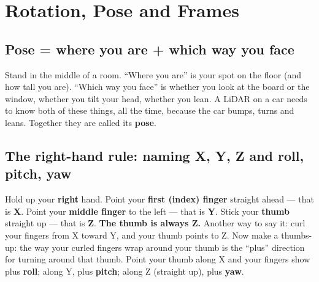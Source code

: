 \chapter{Rotation, Pose and Frames}

\section{Pose = where you are + which way you face}

\begin{kid}
Stand in the middle of a room. ``Where you are'' is your spot on the floor (and how tall you are). ``Which way you face'' is whether you look at the board or the window, whether you tilt your head, whether you lean. A LiDAR on a car needs to know both of these things, all the time, because the car bumps, turns and leans. Together they are called its \textbf{pose}.
\end{kid}


\section{The right-hand rule: naming X, Y, Z and roll, pitch, yaw}

\begin{kid}
Hold up your \textbf{right} hand. Point your \textbf{first (index) finger} straight ahead --- that is \textbf{X}. Point your \textbf{middle finger} to the left --- that is \textbf{Y}. Stick your \textbf{thumb} straight up --- that is \textbf{Z}. \textbf{The thumb is always Z.} Another way to say it: curl your fingers from X toward Y, and your thumb points to Z. Now make a thumbs-up: the way your curled fingers wrap around your thumb is the ``plus'' direction for turning around that thumb. Point your thumb along X and your fingers show plus \textbf{roll}; along Y, plus \textbf{pitch}; along Z (straight up), plus \textbf{yaw}.
\end{kid}



